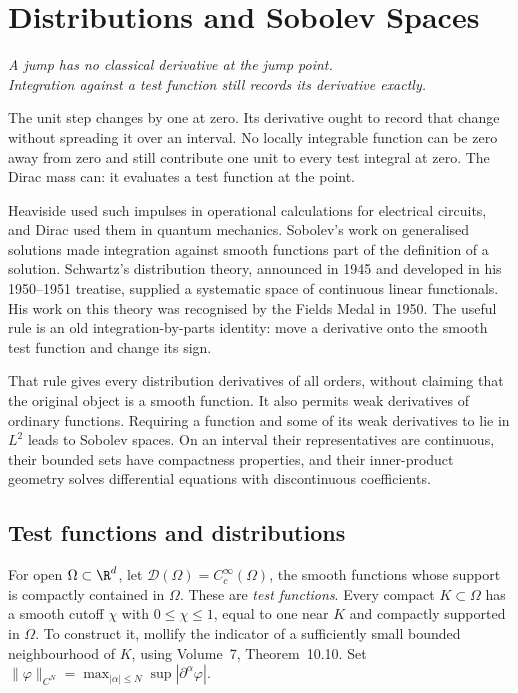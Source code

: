 \chapter{Distributions and Sobolev Spaces}\label{ch:distributions}

\begin{center}\itshape
A jump has no classical derivative at the jump point.\\
Integration against a test function still records its derivative exactly.
\end{center}

The unit step changes by one at zero. Its derivative ought to record that change without spreading it over an interval. No locally integrable function can be zero away from zero and still contribute one unit to every test integral at zero. The Dirac mass can: it evaluates a test function at the point.

Heaviside used such impulses in operational calculations for electrical circuits, and Dirac used them in quantum mechanics. Sobolev's work on generalised solutions made integration against smooth functions part of the definition of a solution. Schwartz's distribution theory, announced in 1945 and developed in his 1950--1951 treatise, supplied a systematic space of continuous linear functionals. His work on this theory was recognised by the Fields Medal in 1950. The useful rule is an old integration-by-parts identity: move a derivative onto the smooth test function and change its sign.

That rule gives every distribution derivatives of all orders, without claiming that the original object is a smooth function. It also permits weak derivatives of ordinary functions. Requiring a function and some of its weak derivatives to lie in $L^2$ leads to Sobolev spaces. On an interval their representatives are continuous, their bounded sets have compactness properties, and their inner-product geometry solves differential equations with discontinuous coefficients.

\section{Test functions and distributions}

For open $\Omega\subset\R^d$, let $\mathcal D(\Omega)=C_c^\infty(\Omega)$, the smooth functions whose support is compactly contained in $\Omega$. These are \emph{test functions}. Every compact $K\subset\Omega$ has a smooth cutoff $\chi$ with $0\le\chi\le1$, equal to one near $K$ and compactly supported in $\Omega$. To construct it, mollify the indicator of a sufficiently small bounded neighbourhood of $K$, using Volume~7, Theorem~10.10. Set
$\|\varphi\|_{C^N}=\max_{|\alpha|\le N}\sup|\partial^\alpha\varphi|$.

